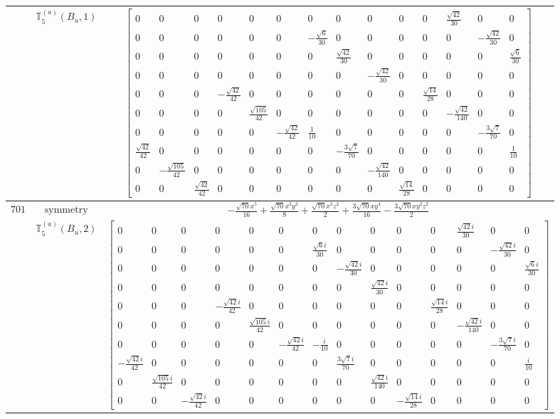 \documentclass[fleqn,8pt,landscape]{jsarticle}
\begin{document}
\begin{longtable}{ccc}
$  $ & $ \mathbb{T}_{5}^{(a)}(B_{u},1) $ & $ \begin{bmatrix} 0 & 0 & 0 & 0 & 0 & 0 & 0 & 0 & 0 & 0 & 0 & \frac{\sqrt{42}}{30} & 0 & 0 \\ 0 & 0 & 0 & 0 & 0 & 0 & - \frac{\sqrt{6}}{30} & 0 & 0 & 0 & 0 & 0 & - \frac{\sqrt{42}}{30} & 0 \\ 0 & 0 & 0 & 0 & 0 & 0 & 0 & \frac{\sqrt{42}}{30} & 0 & 0 & 0 & 0 & 0 & \frac{\sqrt{6}}{30} \\ 0 & 0 & 0 & 0 & 0 & 0 & 0 & 0 & - \frac{\sqrt{42}}{30} & 0 & 0 & 0 & 0 & 0 \\ 0 & 0 & 0 & - \frac{\sqrt{42}}{42} & 0 & 0 & 0 & 0 & 0 & 0 & \frac{\sqrt{14}}{28} & 0 & 0 & 0 \\ 0 & 0 & 0 & 0 & \frac{\sqrt{105}}{42} & 0 & 0 & 0 & 0 & 0 & 0 & - \frac{\sqrt{42}}{140} & 0 & 0 \\ 0 & 0 & 0 & 0 & 0 & - \frac{\sqrt{42}}{42} & \frac{1}{10} & 0 & 0 & 0 & 0 & 0 & - \frac{3 \sqrt{7}}{70} & 0 \\ \frac{\sqrt{42}}{42} & 0 & 0 & 0 & 0 & 0 & 0 & - \frac{3 \sqrt{7}}{70} & 0 & 0 & 0 & 0 & 0 & \frac{1}{10} \\ 0 & - \frac{\sqrt{105}}{42} & 0 & 0 & 0 & 0 & 0 & 0 & - \frac{\sqrt{42}}{140} & 0 & 0 & 0 & 0 & 0 \\ 0 & 0 & \frac{\sqrt{42}}{42} & 0 & 0 & 0 & 0 & 0 & 0 & \frac{\sqrt{14}}{28} & 0 & 0 & 0 & 0 \end{bmatrix} $ \\ \hline
$ 701 $ & $ \text{symmetry} $ & $ - \frac{\sqrt{70} x^{5}}{16} + \frac{\sqrt{70} x^{3} y^{2}}{8} + \frac{\sqrt{70} x^{3} z^{2}}{2} + \frac{3 \sqrt{70} x y^{4}}{16} - \frac{3 \sqrt{70} x y^{2} z^{2}}{2} $ \\
$  $ & $ \mathbb{T}_{5}^{(a)}(B_{u},2) $ & $ \begin{bmatrix} 0 & 0 & 0 & 0 & 0 & 0 & 0 & 0 & 0 & 0 & 0 & \frac{\sqrt{42} i}{30} & 0 & 0 \\ 0 & 0 & 0 & 0 & 0 & 0 & \frac{\sqrt{6} i}{30} & 0 & 0 & 0 & 0 & 0 & - \frac{\sqrt{42} i}{30} & 0 \\ 0 & 0 & 0 & 0 & 0 & 0 & 0 & - \frac{\sqrt{42} i}{30} & 0 & 0 & 0 & 0 & 0 & \frac{\sqrt{6} i}{30} \\ 0 & 0 & 0 & 0 & 0 & 0 & 0 & 0 & \frac{\sqrt{42} i}{30} & 0 & 0 & 0 & 0 & 0 \\ 0 & 0 & 0 & - \frac{\sqrt{42} i}{42} & 0 & 0 & 0 & 0 & 0 & 0 & \frac{\sqrt{14} i}{28} & 0 & 0 & 0 \\ 0 & 0 & 0 & 0 & \frac{\sqrt{105} i}{42} & 0 & 0 & 0 & 0 & 0 & 0 & - \frac{\sqrt{42} i}{140} & 0 & 0 \\ 0 & 0 & 0 & 0 & 0 & - \frac{\sqrt{42} i}{42} & - \frac{i}{10} & 0 & 0 & 0 & 0 & 0 & - \frac{3 \sqrt{7} i}{70} & 0 \\ - \frac{\sqrt{42} i}{42} & 0 & 0 & 0 & 0 & 0 & 0 & \frac{3 \sqrt{7} i}{70} & 0 & 0 & 0 & 0 & 0 & \frac{i}{10} \\ 0 & \frac{\sqrt{105} i}{42} & 0 & 0 & 0 & 0 & 0 & 0 & \frac{\sqrt{42} i}{140} & 0 & 0 & 0 & 0 & 0 \\ 0 & 0 & - \frac{\sqrt{42} i}{42} & 0 & 0 & 0 & 0 & 0 & 0 & - \frac{\sqrt{14} i}{28} & 0 & 0 & 0 & 0 \end{bmatrix} $ \\ \hline

\end{longtable}
\end{document}
